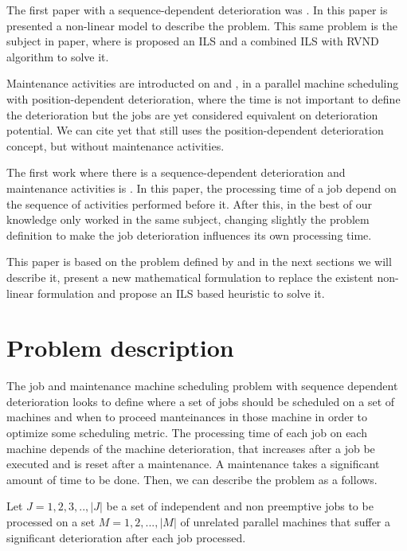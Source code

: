 \documentclass[a4paper,11pt]{article}
\begin{document}
 The first paper with a sequence-dependent deterioration was \citep{RUIZTORRES20132051}. In this paper is presented a non-linear model to describe the problem. This same problem is the subject in \citep{SantosArroyo2015} paper, where is proposed an ILS and a combined ILS with RVND algorithm to solve it. 
 
Maintenance activities are introducted on \citep{Yang2011} and \citep{YANG20121458}, in a parallel machine scheduling with position-dependent deterioration, where the time is not important to define the deterioration but the jobs are yet considered equivalent on deterioration potential. We can cite yet \citep{HUANG20152897} that still uses the position-dependent deterioration concept, but without maintenance activities.
 
The first work where there is a sequence-dependent deterioration and maintenance activities is \citep{ruiz2017makespan}. In this paper, the processing time of a job depend on the sequence of activities performed before it. After this, in the best of our knowledge only \citep{DING201935} worked in the same subject, changing slightly the problem definition to make the job deterioration influences its own processing time. 

This paper is based on the problem defined by \citep{ruiz2017makespan} and in the next sections we will describe it, present a new mathematical formulation to replace the existent non-linear formulation and propose an ILS based heuristic to solve it. 
 
\section{Problem description}

The job and maintenance machine scheduling problem with sequence dependent deterioration looks to define where a set of jobs should be scheduled on a set of machines and when to proceed manteinances in those machine in order to optimize some scheduling metric. The processing time of each job on each machine depends of the machine deterioration, that increases after a job be executed and is reset after a maintenance. A maintenance takes a significant amount of time to be done. Then, we can describe the problem as a follows. 

Let $J={1, 2, 3,..,|J|}$ be a set of independent and non preemptive jobs to be processed on a set $M = {1, 2, ..., |M|}$ of unrelated parallel machines that suffer a significant deterioration after each job processed.
\end{document}
